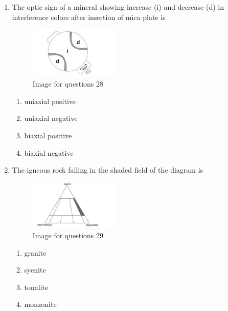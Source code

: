 \documentclass[journal,12pt,onecolumn]{IEEEtran}
\theoremstyle{remark}
\begin{document}
\begin{enumerate}
\item The optic sign of a mineral showing increase (i) and decrease (d) in interference colors after insertion of mica plate is

\begin{figure}[H]
    \centering
    \includegraphics[width=0.4\textwidth]{figs/fig1.png}
    \caption{Image for questions 28}
    \label{fig:question28}
\end{figure}


\begin{multicols}{2}
\begin{enumerate}
\item uniaxial positive  
\item uniaxial negative  
\item biaxial positive  
\item biaxial negative  
\end{enumerate}
\end{multicols}

\item The igneous rock falling in the shaded field of the diagram is

\begin{figure}[H]
    \centering
    \includegraphics[width=0.4\textwidth]{figs/fig2.png}
    \caption{Image for questions 29}
    \label{fig:question29}
\end{figure}




\begin{multicols}{4}
\begin{enumerate}
\item granite  
\item syenite  
\item tonalite  
\item monzonite  
\end{enumerate}
\end{multicols}


\end{enumerate}
\end{document}
